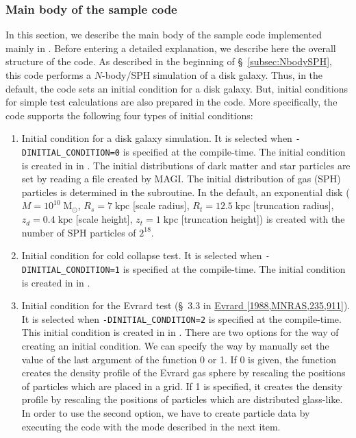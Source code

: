 \subsubsection{Main body of the sample code}
\label{subsubsec:nbodysph_main_routine}
In this section, we describe the main body of the sample code implemented mainly in \fileNameOfMainFunc. Before entering a detailed explanation, we describe here the overall structure of the code. As described in the beginning of \S~\ref{subsec:NbodySPH}, this code performs a $N$-body/SPH simulation of a disk galaxy. Thus, in the default, the code sets an initial condition for a disk galaxy. But, initial conditions for simple test calculations are also prepared in the code. More specifically, the code supports the following four types of initial conditions:
\begin{enumerate}[leftmargin=*,itemsep=-1ex,label=(\alph*)]
\item Initial condition for a disk galaxy simulation. It is selected when \texttt{-DINITIAL\_CONDITION=0} is specified at the compile-time. The initial condition is created in \procedure {} in . The initial distributions of dark matter and star particles are set by reading a file created by \textsc{MAGI}. The initial distribution of gas (SPH) particles is determined in the subroutine. In the default, an exponential disk ($M=10^{10}\;\mathrm{M_{\odot}}$, $R_{s}=7\;\mathrm{kpc}$ [scale radius], $R_{t}=12.5\;\mathrm{kpc}$ [truncation radius], $z_{d}=0.4\;\mathrm{kpc}$ [scale height], $z_{t}=1\;\mathrm{kpc}$ [truncation height]) is created with the number of SPH particles of $2^{18}$.
\item Initial condition for cold collapse test. It is selected when \texttt{-DINITIAL\_CONDITION=1} is specified at the compile-time. The initial condition is created in \procedure {} in .
\item Initial condition for the Evrard test (\S~3.3 in \href{https://doi.org/10.1093/mnras/235.3.911}{Evrard [1988,MNRAS,235,911]}). It is selected when \texttt{-DINITIAL\_CONDITION=2} is specified at the compile-time. This initial condition is created in \procedure {} in . There are two options for the way of creating an initial condition. We can specify the way by manually set the value of the last argument of the function 0 or 1. If 0 is given, the function creates the density profile of the Evrard gas sphere by rescaling the positions of particles which are placed in a grid. If 1 is specified, it creates the density profile by rescaling the positions of particles which are distributed glass-like. In order to use the second option, we have to create particle data by executing the code with the mode described in the next item.

\end{enumerate}
